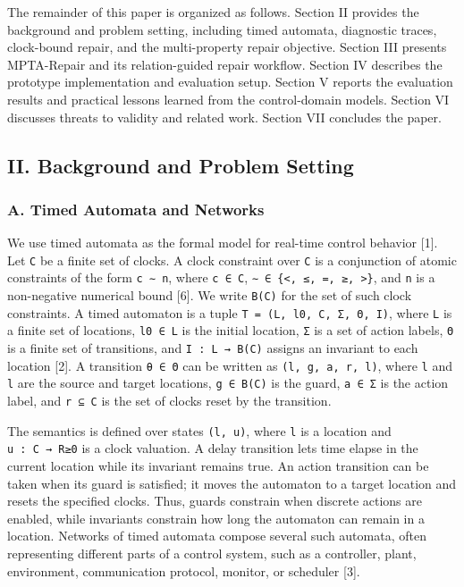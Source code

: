 \documentclass[
]{article}
\begin{document}
The remainder of this paper is organized as follows. Section II provides
the background and problem setting, including timed automata, diagnostic
traces, clock-bound repair, and the multi-property repair objective.
Section III presents MPTA-Repair and its relation-guided repair
workflow. Section IV describes the prototype implementation and
evaluation setup. Section V reports the evaluation results and practical
lessons learned from the control-domain models. Section VI discusses
threats to validity and related work. Section VII concludes the paper.

\subsection{II. Background and Problem
Setting}\label{ii.-background-and-problem-setting}

\subsubsection{A. Timed Automata and
Networks}\label{a.-timed-automata-and-networks}

We use timed automata as the formal model for real-time control behavior
{[}1{]}. Let \texttt{C} be a finite set of clocks. A clock constraint
over \texttt{C} is a conjunction of atomic constraints of the form
\texttt{c\ ∼\ n}, where \texttt{c\ ∈\ C},
\texttt{∼\ ∈\ \{\textless{},\ ≤,\ =,\ ≥,\ \textgreater{}\}}, and
\texttt{n} is a non-negative numerical bound {[}6{]}. We write
\texttt{B(C)} for the set of such clock constraints. A timed automaton
is a tuple \texttt{T\ =\ (L,\ l0,\ C,\ Σ,\ Θ,\ I)}, where \texttt{L} is
a finite set of locations, \texttt{l0\ ∈\ L} is the initial location,
\texttt{Σ} is a set of action labels, \texttt{Θ} is a finite set of
transitions, and \texttt{I\ :\ L\ →\ B(C)} assigns an invariant to each
location {[}2{]}. A transition \texttt{θ\ ∈\ Θ} can be written as
\texttt{(l,\ g,\ a,\ r,\ l\textquotesingle{})}, where \texttt{l} and
\texttt{l\textquotesingle{}} are the source and target locations,
\texttt{g\ ∈\ B(C)} is the guard, \texttt{a\ ∈\ Σ} is the action label,
and \texttt{r\ ⊆\ C} is the set of clocks reset by the transition.

The semantics is defined over states \texttt{(l,\ u)}, where \texttt{l}
is a location and \texttt{u\ :\ C\ →\ R≥0} is a clock valuation. A delay
transition lets time elapse in the current location while its invariant
remains true. An action transition can be taken when its guard is
satisfied; it moves the automaton to a target location and resets the
specified clocks. Thus, guards constrain when discrete actions are
enabled, while invariants constrain how long the automaton can remain in
a location. Networks of timed automata compose several such automata,
often representing different parts of a control system, such as a
controller, plant, environment, communication protocol, monitor, or
scheduler {[}3{]}.
\end{document}
